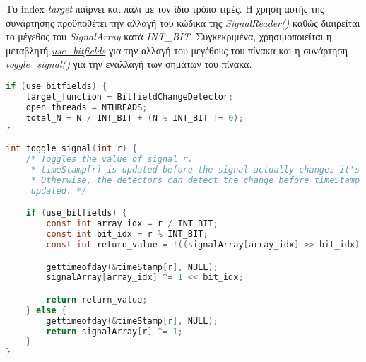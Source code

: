 Το index \textit{target} παίρνει και πάλι με τον ίδιο τρόπο τιμές.
Η χρήση αυτής της συνάρτησης προϋποθέτει την αλλαγή του κώδικα της 
\textit{SignalReader()} 
καθώς διαιρείται το μέγεθος του \textit{SignalArray} κατά \textit{INT\_BIT}. 
Συγκεκριμένα, χρησιμοποιείται η μεταβλητή 
\hyperref[lst:total_N]{\textit{use\_bitfields}} για την αλλαγή του μεγέθους του 
πίνακα και η συνάρτηση \hyperref[lst:togle_signal]{\textit{toggle\_signal()}} 
για την 
εναλλαγή των σημάτων του πίνακα.
\begin{lstlisting}[language=c, caption={Αλλαγή μεγέθους του SignalArray}, 
escapechar=$, label={lst:total_N}]
if (use_bitfields) {
    target_function = BitfieldChangeDetector;
    open_threads = NTHREADS;
    total_N = N / INT_BIT + (N % INT_BIT != 0);
}
\end{lstlisting}
\begin{lstlisting}[language=c, caption={toggle\_signal()}, 
escapechar=$, label={lst:togle_signal}]
int toggle_signal(int r) {
    /* Toggles the value of signal r.
     * timeStamp[r] is updated before the signal actually changes it's value.
     * Otherwise, the detectors can detect the change before timeStamp is 
     updated. */

    if (use_bitfields) {
        const int array_idx = r / INT_BIT;
        const int bit_idx = r % INT_BIT;
        const int return_value = !((signalArray[array_idx] >> bit_idx) & 1);

        gettimeofday(&timeStamp[r], NULL);
        signalArray[array_idx] ^= 1 << bit_idx;

        return return_value;
    } else {
        gettimeofday(&timeStamp[r], NULL);
        return signalArray[r] ^= 1;
    }
}
\end{lstlisting}